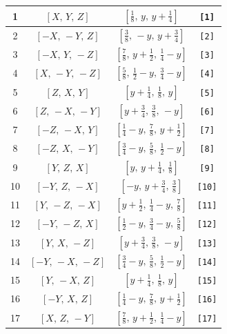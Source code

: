 \documentclass[fleqn,8pt]{jsarticle}
\begin{document}
\begin{longtable}{cccc}
1 & $\left[ X,\, Y,\, Z \right]$ & $\left[ \frac{1}{8},\, y,\, y + \frac{1}{4} \right]$ & {\tt [1]} \\ \hline
2 & $\left[ - X,\, - Y,\, Z \right]$ & $\left[ \frac{3}{8},\, - y,\, y + \frac{3}{4} \right]$ & {\tt [2]} \\ \hline
3 & $\left[ - X,\, Y,\, - Z \right]$ & $\left[ \frac{7}{8},\, y + \frac{1}{2},\, \frac{1}{4} - y \right]$ & {\tt [3]} \\ \hline
4 & $\left[ X,\, - Y,\, - Z \right]$ & $\left[ \frac{5}{8},\, \frac{1}{2} - y,\, \frac{3}{4} - y \right]$ & {\tt [4]} \\ \hline
5 & $\left[ Z,\, X,\, Y \right]$ & $\left[ y + \frac{1}{4},\, \frac{1}{8},\, y \right]$ & {\tt [5]} \\ \hline
6 & $\left[ Z,\, - X,\, - Y \right]$ & $\left[ y + \frac{3}{4},\, \frac{3}{8},\, - y \right]$ & {\tt [6]} \\ \hline
7 & $\left[ - Z,\, - X,\, Y \right]$ & $\left[ \frac{1}{4} - y,\, \frac{7}{8},\, y + \frac{1}{2} \right]$ & {\tt [7]} \\ \hline
8 & $\left[ - Z,\, X,\, - Y \right]$ & $\left[ \frac{3}{4} - y,\, \frac{5}{8},\, \frac{1}{2} - y \right]$ & {\tt [8]} \\ \hline
9 & $\left[ Y,\, Z,\, X \right]$ & $\left[ y,\, y + \frac{1}{4},\, \frac{1}{8} \right]$ & {\tt [9]} \\ \hline
10 & $\left[ - Y,\, Z,\, - X \right]$ & $\left[ - y,\, y + \frac{3}{4},\, \frac{3}{8} \right]$ & {\tt [10]} \\ \hline
11 & $\left[ Y,\, - Z,\, - X \right]$ & $\left[ y + \frac{1}{2},\, \frac{1}{4} - y,\, \frac{7}{8} \right]$ & {\tt [11]} \\ \hline
12 & $\left[ - Y,\, - Z,\, X \right]$ & $\left[ \frac{1}{2} - y,\, \frac{3}{4} - y,\, \frac{5}{8} \right]$ & {\tt [12]} \\ \hline
13 & $\left[ Y,\, X,\, - Z \right]$ & $\left[ y + \frac{3}{4},\, \frac{3}{8},\, - y \right]$ & {\tt [13]} \\ \hline
14 & $\left[ - Y,\, - X,\, - Z \right]$ & $\left[ \frac{3}{4} - y,\, \frac{5}{8},\, \frac{1}{2} - y \right]$ & {\tt [14]} \\ \hline
15 & $\left[ Y,\, - X,\, Z \right]$ & $\left[ y + \frac{1}{4},\, \frac{1}{8},\, y \right]$ & {\tt [15]} \\ \hline
16 & $\left[ - Y,\, X,\, Z \right]$ & $\left[ \frac{1}{4} - y,\, \frac{7}{8},\, y + \frac{1}{2} \right]$ & {\tt [16]} \\ \hline
17 & $\left[ X,\, Z,\, - Y \right]$ & $\left[ \frac{7}{8},\, y + \frac{1}{2},\, \frac{1}{4} - y \right]$ & {\tt [17]} \\ \hline

\end{longtable}
\end{document}
